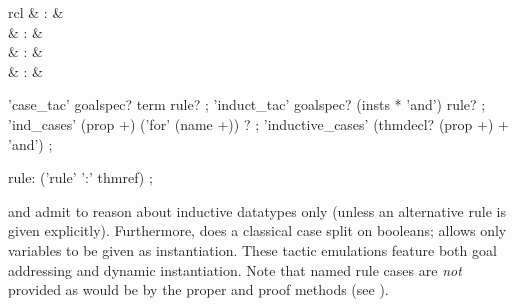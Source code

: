 \begin{isabellebody}
\begin{isamarkuptext}
  \begin{matharray}{rcl}
    \hypertarget{method.HOL.case-tac}{\hyperlink{method.HOL.case-tac}{\mbox{}}}\isa{{\isachardoublequote}\isactrlsup {\isacharasterisk}{\isachardoublequote}} & : & \isarmeth \\
    \hypertarget{method.HOL.induct-tac}{\hyperlink{method.HOL.induct-tac}{\mbox{}}}\isa{{\isachardoublequote}\isactrlsup {\isacharasterisk}{\isachardoublequote}} & : & \isarmeth \\
    \hypertarget{method.HOL.ind-cases}{\hyperlink{method.HOL.ind-cases}{\mbox{}}}\isa{{\isachardoublequote}\isactrlsup {\isacharasterisk}{\isachardoublequote}} & : & \isarmeth \\
    \hypertarget{command.HOL.inductive-cases}{\hyperlink{command.HOL.inductive-cases}{\mbox{}}} & : &  \\
  \end{matharray}

  \begin{rail}
    'case\_tac' goalspec? term rule?
    ;
    'induct\_tac' goalspec? (insts * 'and') rule?
    ;
    'ind\_cases' (prop +) ('for' (name +)) ?
    ;
    'inductive\_cases' (thmdecl? (prop +) + 'and')
    ;

    rule: ('rule' ':' thmref)
    ;
  \end{rail}

  \begin{descr}

  \item [\hyperlink{method.HOL.case-tac}{\mbox{\isa{case{\isacharunderscore}tac}}} and \hyperlink{method.HOL.induct-tac}{\mbox{\isa{induct{\isacharunderscore}tac}}}]
  admit to reason about inductive datatypes only (unless an
  alternative rule is given explicitly).  Furthermore, \hyperlink{method.HOL.case-tac}{\mbox{}} does a classical case split on booleans; \hyperlink{method.HOL.induct-tac}{\mbox{}} allows only variables to be given as instantiation.
  These tactic emulations feature both goal addressing and dynamic
  instantiation.  Note that named rule cases are \emph{not} provided
  as would be by the proper \hyperlink{method.induct}{\mbox{}} and \hyperlink{method.cases}{\mbox{}} proof
  methods (see ).
  

\end{descr}
\end{isamarkuptext}
\end{isabellebody}
